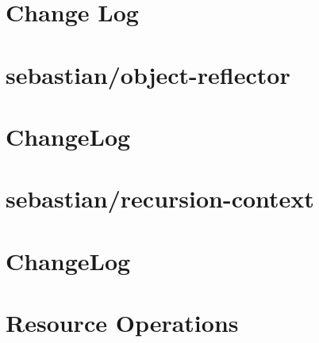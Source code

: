 \documentclass[twoside]{book}
\newcommand{\+}{\discretionary{\mbox{\scriptsize$\hookleftarrow$}}{}{}}
\begin{document}
\chapter{Change Log}
\label{md__c__workspace__proyecto__p_h_p_project_vendor_sebastian_object_reflector__change_log}

\chapter{sebastian/object-\/reflector}
\label{md__c__workspace__proyecto__p_h_p_project_vendor_sebastian_object_reflector__r_e_a_d_m_e}

\chapter{Change\+Log}
\label{md__c__workspace__proyecto__p_h_p_project_vendor_sebastian_recursion_context__change_log}

\chapter{sebastian/recursion-\/context}
\label{md__c__workspace__proyecto__p_h_p_project_vendor_sebastian_recursion_context__r_e_a_d_m_e}

\chapter{Change\+Log}
\label{md__c__workspace__proyecto__p_h_p_project_vendor_sebastian_resource_operations__change_log}

\chapter{Resource Operations}
\label{md__c__workspace__proyecto__p_h_p_project_vendor_sebastian_resource_operations__r_e_a_d_m_e}

\end{document}
